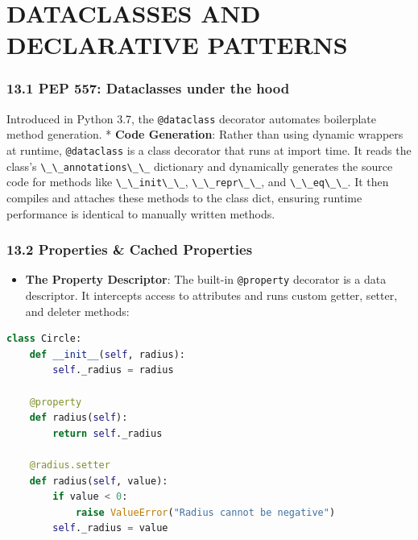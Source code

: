 \hypertarget{dataclasses-and-declarative-patterns}{%
\chapter{DATACLASSES AND DECLARATIVE
PATTERNS}\label{dataclasses-and-declarative-patterns}}

\hypertarget{pep-557-dataclasses-under-the-hood}{%
\subsection{13.1 PEP 557: Dataclasses under the
hood}\label{pep-557-dataclasses-under-the-hood}}

Introduced in Python 3.7, the \passthrough{\lstinline!@dataclass!}
decorator automates boilerplate method generation. * \textbf{Code
Generation}: Rather than using dynamic wrappers at runtime,
\passthrough{\lstinline!@dataclass!} is a class decorator that runs at
import time. It reads the class's
\passthrough{\lstinline!\_\_annotations\_\_!} dictionary and dynamically
generates the source code for methods like
\passthrough{\lstinline!\_\_init\_\_!},
\passthrough{\lstinline!\_\_repr\_\_!}, and
\passthrough{\lstinline!\_\_eq\_\_!}. It then compiles and attaches
these methods to the class dict, ensuring runtime performance is
identical to manually written methods.

\hypertarget{properties-cached-properties}{%
\subsection{13.2 Properties \& Cached
Properties}\label{properties-cached-properties}}

\begin{itemize}
\tightlist
\item
  \textbf{The Property Descriptor}: The built-in
  \passthrough{\lstinline!@property!} decorator is a data descriptor. It
  intercepts access to attributes and runs custom getter, setter, and
  deleter methods:
\end{itemize}

\begin{lstlisting}[language=Python]
class Circle:
    def __init__(self, radius):
        self._radius = radius

    @property
    def radius(self):
        return self._radius

    @radius.setter
    def radius(self, value):
        if value < 0:
            raise ValueError("Radius cannot be negative")
        self._radius = value
\end{lstlisting}

